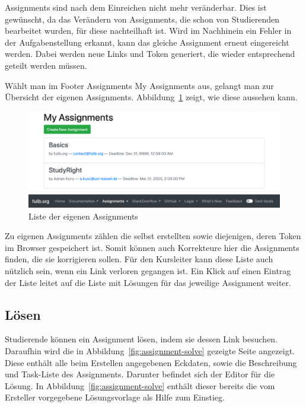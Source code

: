 Assignments sind nach dem Einreichen nicht mehr veränderbar.
Dies ist gewünscht, da das Verändern von Assignments, die schon von Studierenden bearbeitet wurden, für diese nachteilhaft ist.
Wird im Nachhinein ein Fehler in der Aufgabenstellung erkannt, kann das gleiche Assignment erneut eingereicht werden.
Dabei werden neue Links und Token generiert, die wieder entsprechend geteilt werden müssen.

Wählt man im Footer Assignments \textrightarrow My Assignments aus, gelangt man zur Übersicht der eigenen Assignments.
Abbildung~\ref{fig:my-assignments} zeigt, wie diese aussehen kann.

\begin{figure}
    \centering
    \includegraphics[width=\textwidth]{chapter/fulib.org/img/my-assignments.png}
    \caption{Liste der eigenen Assignments}
    \label{fig:my-assignments}
\end{figure}

Zu eigenen Assignments zählen die selbst erstellten sowie diejenigen, deren Token im Browser gespeichert ist.
Somit können auch Korrekteure hier die Assignments finden, die sie korrigieren sollen.
Für den Kursleiter kann diese Liste auch nützlich sein, wenn ein Link verloren gegangen ist.
Ein Klick auf einen Eintrag der Liste leitet auf die Liste mit Lösungen für das jeweilige Assignment weiter.

\subsection{Lösen}\label{subsec:solution}

Studierende können ein Assignment lösen, indem sie dessen Link besuchen.
Daraufhin wird die in Abbildung~\ref{fig:assignment-solve} gezeigte Seite angezeigt.
Diese enthält alle beim Erstellen angegebenen Eckdaten, sowie die Beschreibung und Task-Liste des Assignments.
Darunter befindet sich der Editor für die Lösung.
In Abbildung~\ref{fig:assignment-solve} enthält dieser bereits die vom Ersteller vorgegebene Lösungsvorlage als Hilfe zum Einstieg.


